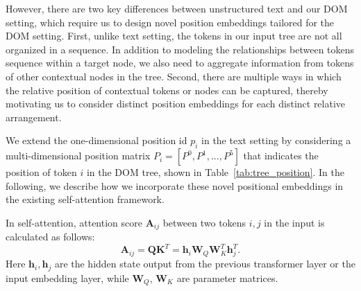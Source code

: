 \documentclass[sigconf, nonacm]{acmart}
\newcommand{\nop}[1]{}
\begin{document}
However, there are two key differences between unstructured text and our DOM setting, which require us to design novel position embeddings tailored for the DOM setting. First, unlike text setting, the tokens in our input tree are not all organized in a sequence. In addition to modeling the relationships between tokens sequence within a target node, we also need to aggregate information from tokens of other contextual nodes in the tree. Second, there are multiple ways in which the relative position of contextual tokens or nodes can be captured, thereby motivating us to consider distinct position embeddings for each distinct relative arrangement. 
\begin{table}[]
    \centering
    \caption{Various tree position features for a node/token.\nop{, each corresponding to one entry in the position matrix $P$.}}\vspace{-10pt}
    \vspace{-5pt}
    \label{tab:tree_position}
\end{table}

We extend the one-dimensional position id $p_i$ in the text setting by considering a multi-dimensional position matrix $P_i=[P^0, P^1, ...,P^5]$ that indicates the position of token $i$ in the DOM tree, shown in Table~\ref{tab:tree_position}. In the following, we describe how we incorporate these novel positional embeddings in the existing self-attention framework.

In self-attention, attention score  $\boldsymbol{A}_{i j}$ between two tokens $i, j$ in the input is calculated as follows:
\begin{equation}
\boldsymbol{A}_{i j}= \boldsymbol{Q} \boldsymbol{K}^{T} = \mathbf{h}_{i} \boldsymbol{W}_{Q}\boldsymbol{W}_{K}^{T}\mathbf{h}_{j}^{T}.
\label{eqn:attention_score}
\end{equation}
Here $\mathbf{h}_i, \mathbf{h}_j$ are the hidden state output from the previous transformer layer or the input embedding layer, while $\boldsymbol{W}_{Q}$, $\boldsymbol{W}_{K}$ are parameter matrices. 
\end{document}
